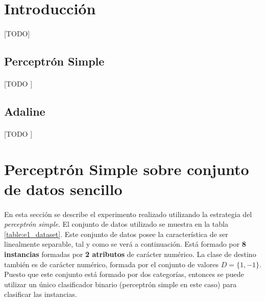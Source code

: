 \documentclass{article}
\begin{document}
	\maketitle %

	\thispagestyle{fancy} %



	\begin{abstract}
		\noindent [TODO ]
	\end{abstract}



	\section{Introducción}
	\label{sec:introducción}

		\paragraph{}
		[TODO]

		\subsection{Perceptrón Simple}
		\label{sec:simple_perceptron}

			\paragraph{}
			[TODO ]


		\subsection{Adaline}
		\label{sec:adaline}

			\paragraph{}
			[TODO ]

	\section{Perceptrón Simple sobre conjunto de datos sencillo}
	\label{sec:e1}

		\paragraph{}
		En esta sección se describe el experimento realizado utilizando la estrategia del \emph{perceptrón simple}. El conjunto de datos utilizado se muestra en la tabla \ref{table:e1_dataset}. Este conjunto de datos posee la característica de ser linealmente separable, tal y como se verá a continuación. Está formado por \textbf{8 instancias} formadas por \textbf{2 atributos} de carácter numérico. La clase de destino también es de carácter numérico, formada por el conjunto de valores $D = \{1,-1\}$. Puesto que este conjunto está formado por dos categorías, entonces se puede utilizar un único clasificador binario (perceptrón simple en este caso) para clasificar las instancias.
\end{document}
